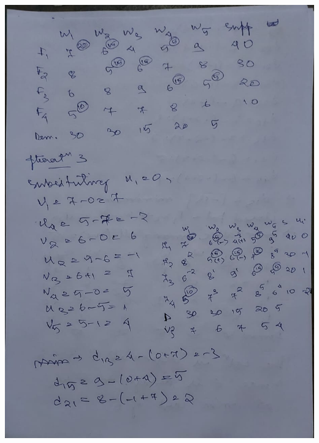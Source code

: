 \documentclass[12pt, letterpaper, twoside]{book}
\begin{document}
\includegraphics[width=\paperwidth, height=\paperheight]{Page14}
\end{document}

